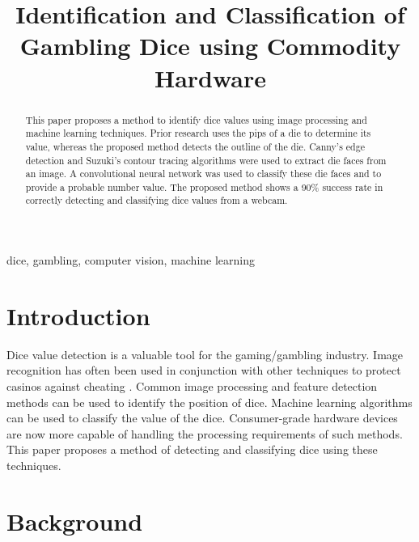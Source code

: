 \documentclass[conference]{IEEEtran}
\begin{document}
\title{
	Identification and Classification of Gambling Dice using Commodity Hardware
}

\author{
}

\maketitle

\begin{abstract}
	This paper proposes a method to identify dice values using image processing and machine learning techniques.
	Prior research uses the pips of a die to determine its value, whereas the proposed method detects the outline of the die.
	Canny's edge detection and Suzuki's contour tracing algorithms were used to extract die faces from an image.
	A convolutional neural network was used to classify these die faces and to provide a probable number value.
	The proposed method shows a 90\% success rate in correctly detecting and classifying dice values from a webcam.
\end{abstract}

\begin{IEEEkeywords}
	dice, gambling, computer vision, machine learning
\end{IEEEkeywords}

\section{Introduction}

Dice value detection is a valuable tool for the gaming/gambling industry.
Image recognition has often been used in conjunction with other techniques to protect casinos against cheating \cite{4129523}\cite{Correia1995}.
Common image processing and feature detection methods can be used to identify the position of dice.
Machine learning algorithms can be used to classify the value of the dice.
Consumer-grade hardware devices are now more capable of handling the processing requirements of such methods.
This paper proposes a method of detecting and classifying dice using these techniques.

\section{Background}
\end{document}
